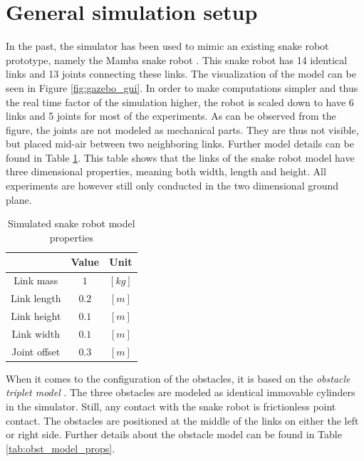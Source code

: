 \section{General simulation setup}\label{sec:simsetup}

In the past, the simulator has been used to mimic an existing snake robot prototype, namely the Mamba snake robot \cite{liljeback2014mamba}. This snake robot has 14 identical links and 13 joints connecting these links. The visualization of the model can be seen in Figure \ref{fig:gazebo_gui}. In order to make computations simpler and thus the real time factor of the simulation higher, the robot is scaled down to have 6 links and 5 joints for most of the experiments. As can be observed from the figure, the joints are not modeled as mechanical parts. They are thus not visible, but placed mid-air between two neighboring links.
Further model details can be found in Table \ref{tab:snake_model_props}. This table shows that the links of the snake robot model have three dimensional properties, meaning both width, length and height. All experiments are however still only conducted in the two dimensional ground plane.

\begin{table}[]
    \centering
    \begin{tabular}{|c|c|c|}
        \hline
        & Value & Unit\\
        \hline
        Link mass & $1$ & $[kg]$ \\
        Link length & $0.2$ & $[m]$ \\
        Link height & $0.1$ & $[m]$ \\
        Link width & $0.1$ & $[m]$ \\
        Joint offset & $0.3$ & $[m]$\\
        \hline
    \end{tabular}
    \caption{Simulated snake robot model properties}
    \label{tab:snake_model_props}
\end{table}

When it comes to the configuration of the obstacles, it is based on the \textit{obstacle triplet model} \cite{sanfilippo2018snakesim}. The three obstacles are modeled as identical immovable cylinders in the simulator. Still, any contact with the snake robot is frictionless point contact. The obstacles are positioned at the middle of the links on either the left or right side. Further details about the obstacle model can be found in Table \ref{tab:obst_model_props}.


